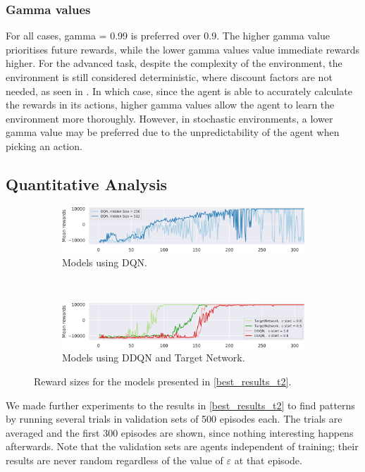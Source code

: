 \subsubsection{Gamma values}
For all cases, gamma = 0.99 is preferred over 0.9. The higher gamma value prioritises future rewards, while the lower gamma values value immediate rewards higher. For the advanced task, despite the complexity of the environment, the environment is still considered deterministic, where discount factors are not needed, as seen in \cite{DRL_Hands_On}. In which case, since the agent is able to accurately calculate the rewards in its actions, higher gamma values allow the agent to learn the environment more thoroughly. However, in stochastic environments, a lower gamma value may be preferred due to the unpredictability of the agent when picking an action.

\subsection{Quantitative Analysis}
\label{candidate_comparison}

\begin{figure}[h]
	\begin{subfigure}{\textwidth}
		\includegraphics[width=\textwidth]{dqn_reward_size.png}
		\caption{Models using DQN.}
		\label{dqn_avg_reward}
	\end{subfigure} \\[1ex]
	\begin{subfigure}{\textwidth}
		\includegraphics[width=\textwidth]{rest_reward_size.png}
		\caption{Models using DDQN and Target Network.}
		\label{rest_avg_reward}
	\end{subfigure}
	\caption{Reward sizes for the models presented in \cref{best_results_t2}.}
	\label{avg_reward}
	\vspace{-14pt}
\end{figure}

We made further experiments to the results in \cref{best_results_t2} to find patterns by running several trials in validation sets of 500 episodes each.
The trials are averaged and the first 300 episodes are shown, since nothing interesting happens afterwards.
Note that the validation sets are agents independent of training; their results are never random regardless of the value of $\varepsilon$ at that episode.

